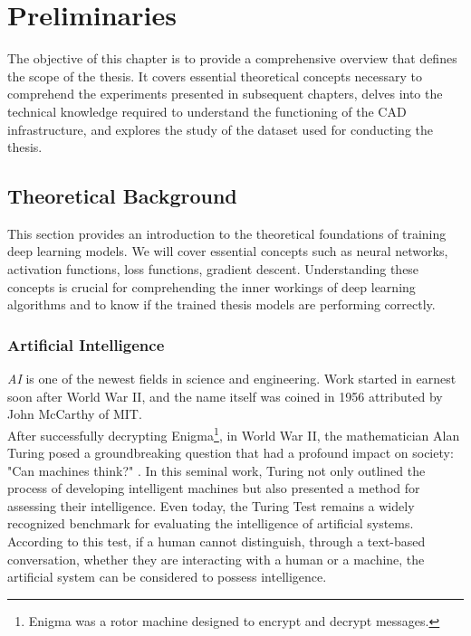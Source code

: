 \chapter{Preliminaries}
\label{cap:prelim}

The objective of this chapter is to provide a comprehensive overview that defines the scope of the thesis. It covers essential theoretical concepts necessary to comprehend the experiments presented in subsequent chapters, delves into the technical knowledge required to understand the functioning of the CAD infrastructure, and explores the study of the dataset used for conducting the thesis.

\section{Theoretical Background}

This section provides an introduction to the theoretical foundations of training deep learning models. We will cover essential concepts such as neural networks, activation functions, loss functions, gradient descent. Understanding these concepts is crucial for comprehending the inner workings of deep learning algorithms and to know if the trained thesis models are performing correctly.

\subsection{Artificial Intelligence}

\textit{AI} is one of the newest fields in science and engineering. Work started in earnest soon
after World War II, and the name itself was coined in 1956 attributed by John McCarthy of MIT. \\

After successfully decrypting Enigma\footnote{Enigma was a rotor machine designed to encrypt and decrypt messages.}, in World War II, the mathematician Alan Turing posed a groundbreaking question that had a profound impact on society: "Can machines think?" \cite{CanMachineThink}. In this seminal work, Turing not only outlined the process of developing intelligent machines but also presented a method for assessing their intelligence. Even today, the Turing Test remains a widely recognized benchmark for evaluating the intelligence of artificial systems. According to this test, if a human cannot distinguish, through a text-based conversation, whether they are interacting with a human or a machine, the artificial system can be considered to possess intelligence. \\

